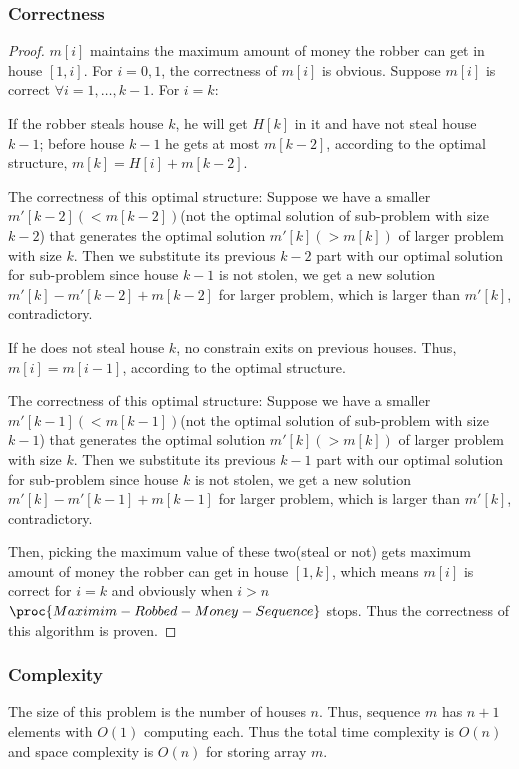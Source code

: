 \documentclass[]{article}
\begin{document}
            \subsubsection{Correctness}
                \begin{proof}
                $m[i]$ maintains the maximum amount of money the robber can get in house $[1,i]$. For $i = 0,1$, the correctness of $m[i]$ is obvious. Suppose $m[i]$ is correct $\forall i= 1,\dots,k-1$. For $i = k$:
                    \item If the robber steals house $k$, he will get $H[k]$ in it and have not steal house $k-1$; before house $k-1$ he gets at most $m[k-2]$, according to the optimal structure, $m[k] = H[i]+m[k-2]$. 
                    \item The correctness of this optimal structure: Suppose we have a smaller $m'[k-2](<m[k-2])$(not the optimal solution of sub-problem with size $k-2$) that generates the optimal solution $m'[k](>m[k])$ of larger problem with size $k$. Then we substitute its previous $k-2$ part with our optimal solution for sub-problem since house $k-1$ is not stolen, we get a new solution $m'[k] - m'[k-2] + m[k-2]$ for larger problem, which is larger than $m'[k]$, contradictory.
                 \item If he does not steal house $k$, no constrain exits on previous houses. Thus, $m[i] = m[i-1]$, according to the optimal structure.
                 \item The correctness of this optimal structure: Suppose we have a smaller $m'[k-1](<m[k-1])$(not the optimal solution of sub-problem with size $k-1$) that generates the optimal solution $m'[k](>m[k])$ of larger problem with size $k$. Then we substitute its previous $k-1$ part with our optimal solution for sub-problem since house $k$ is not stolen, we get a new solution $m'[k] - m'[k-1] + m[k-1]$ for larger problem, which is larger than $m'[k]$, contradictory.
                 \item Then, picking the maximum value of these two(steal or not) gets maximum amount of money the robber can get in house $[1,k]$, which means $m[i]$ is correct for $i = k$ and obviously when $i>n$ $\proc{Maximim-Robbed-Money-Sequence}$ stops. Thus the correctness of this algorithm is proven.
                \end{proof} 
            
            \subsubsection{Complexity}The size of this problem is the number of houses $n$. Thus, sequence $m$ has $n+1$ elements with $O(1)$ computing each. Thus the total time complexity is $O(n)$ and space complexity is    $O(n)$ for storing array $m$.
        
\end{document}
